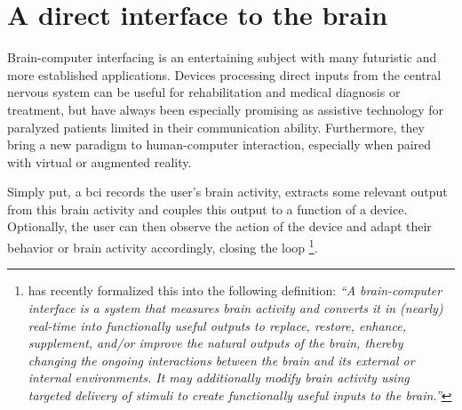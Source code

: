 
\section{A direct interface to the brain}

Brain-computer interfacing is an entertaining subject with many futuristic and more established
applications.
Devices processing direct inputs from the central nervous system can be
useful for rehabilitation and medical diagnosis or treatment, but
have always been especially promising as assistive technology for
paralyzed patients limited in their communication ability.
Furthermore, they bring a new paradigm to human-computer interaction,
especially when paired with virtual or augmented reality.

Simply put, a \ac{bci} records the user's brain activity, extracts some
relevant output from this brain activity and couples this output to a function
of a device.
Optionally, the user can then observe the action of the device and adapt their
behavior or brain activity accordingly, closing the loop
\footnote{%
  \textcite{BCISociety2024} has recently formalized this into the
  following definition:
  \it``A brain-computer interface is a system that measures brain activity and
  converts it in (nearly) real-time into functionally useful outputs to replace,
  restore, enhance, supplement, and/or improve the natural outputs of the brain,
  thereby changing the ongoing interactions between the brain and its external or
  internal environments. It may additionally modify brain activity using targeted
  delivery of stimuli to create functionally useful inputs to the
  brain.''
}.


